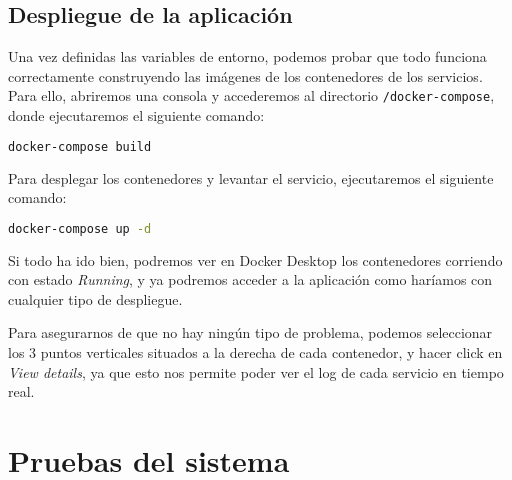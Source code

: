 \subsection{Despliegue de la aplicación}


Una vez definidas las variables de entorno, podemos probar que todo funciona correctamente construyendo las imágenes de los contenedores de los servicios. Para ello, abriremos una consola y accederemos al directorio \verb,/docker-compose,, donde ejecutaremos el siguiente comando:

\begin{lstlisting}[language=Bash]
docker-compose build
\end{lstlisting}


Para desplegar los contenedores y levantar el servicio, ejecutaremos el siguiente comando:

\begin{lstlisting}[language=Bash]
docker-compose up -d
\end{lstlisting}


Si todo ha ido bien, podremos ver en Docker Desktop los contenedores corriendo con estado \textit{Running}, y ya podremos acceder a la aplicación como haríamos con cualquier tipo de despliegue. 


Para asegurarnos de que no hay ningún tipo de problema, podemos seleccionar los 3 puntos verticales situados a la derecha de cada contenedor, y hacer click en \textit{View details}, ya que esto nos permite poder ver el log de cada servicio en tiempo real. 

\section{Pruebas del sistema}
